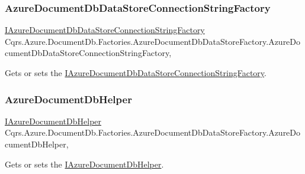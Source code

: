 \subsubsection{\texorpdfstring{Azure\+Document\+Db\+Data\+Store\+Connection\+String\+Factory}{AzureDocumentDbDataStoreConnectionStringFactory}}
{\footnotesize\ttfamily \hyperlink{interfaceCqrs_1_1Azure_1_1DocumentDb_1_1Factories_1_1IAzureDocumentDbDataStoreConnectionStringFactory}{I\+Azure\+Document\+Db\+Data\+Store\+Connection\+String\+Factory} Cqrs.\+Azure.\+Document\+Db.\+Factories.\+Azure\+Document\+Db\+Data\+Store\+Factory.\+Azure\+Document\+Db\+Data\+Store\+Connection\+String\+Factory\hspace{0.3cm}{\ttfamily [get]}, {\ttfamily [protected]}}



Gets or sets the \hyperlink{interfaceCqrs_1_1Azure_1_1DocumentDb_1_1Factories_1_1IAzureDocumentDbDataStoreConnectionStringFactory}{I\+Azure\+Document\+Db\+Data\+Store\+Connection\+String\+Factory}. 

\mbox{\label{classCqrs_1_1Azure_1_1DocumentDb_1_1Factories_1_1AzureDocumentDbDataStoreFactory_a0fd0cb66b802fd374dbf8f89e7cdfbdc_a0fd0cb66b802fd374dbf8f89e7cdfbdc}} 
\subsubsection{\texorpdfstring{Azure\+Document\+Db\+Helper}{AzureDocumentDbHelper}}
{\footnotesize\ttfamily \hyperlink{interfaceCqrs_1_1Azure_1_1DocumentDb_1_1IAzureDocumentDbHelper}{I\+Azure\+Document\+Db\+Helper} Cqrs.\+Azure.\+Document\+Db.\+Factories.\+Azure\+Document\+Db\+Data\+Store\+Factory.\+Azure\+Document\+Db\+Helper\hspace{0.3cm}{\ttfamily [get]}, {\ttfamily [protected]}}



Gets or sets the \hyperlink{interfaceCqrs_1_1Azure_1_1DocumentDb_1_1IAzureDocumentDbHelper}{I\+Azure\+Document\+Db\+Helper}. 

